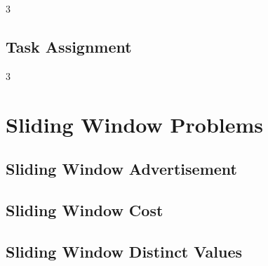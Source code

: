 \documentclass[8pt]{extarticle}
\begin{document}
\begin{multicols*}{3}
\subsection{Task Assignment}
\begin{caixaenunciado}

\end{caixaenunciado}
\vspace{0.3cm}

\end{multicols*}
\pagebreak
\begin{multicols*}{3}

\section{Sliding Window Problems}

\subsection{Sliding Window Advertisement}
\begin{caixaenunciado}

\end{caixaenunciado}
\vspace{0.3cm}


\subsection{Sliding Window Cost}
\begin{caixaenunciado}

\end{caixaenunciado}
\vspace{0.3cm}


\subsection{Sliding Window Distinct Values}
\begin{caixaenunciado}

\end{caixaenunciado}
\vspace{0.3cm}



\end{multicols*}
\end{document}
